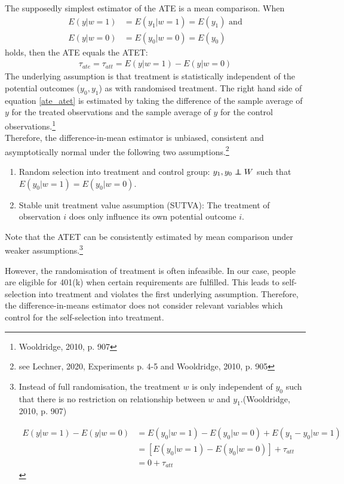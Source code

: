 \documentclass{article}
\newcommand\independent{\protect\mathpalette{\protect\independenT}{\perp}}
\def\independenT#1#2{\mathrel{\rlap{$#1#2$}\mkern2mu{#1#2}}}
\begin{document}
The supposedly simplest estimator of the ATE is a mean comparison. When 
\begin{align*}
    E(y|w=1) &= E(y_1|w=1)=E(y_1) \text{   and} \\
    E(y|w=0) &= E(y_0|w=0)=E(y_0)
\end{align*}
holds, then the ATE equals the ATET:
\begin{align}
    \tau_{ate} = \tau_{att} = E(y|w=1) - E(y|w=0)
    \label{ate_atet}
\end{align}
The underlying assumption is that treatment is statistically independent of the potential outcomes ($y_0, y_1$) as with randomised treatment. The right hand side of equation \ref{ate_atet} is estimated by taking the difference of the sample average of $y$ for the treated observations and the sample average of $y$ for the control observations.\footnote{Wooldridge, 2010, p. 907} \\
Therefore, the difference-in-mean estimator is unbiased, consistent and asymptotically normal under the following two assumptions.\footnote{see Lechner, 2020, Experiments p. 4-5 and Wooldridge, 2010, p. 905}
\begin{enumerate}
    \item Random selection into treatment and control group: $y_1, y_0 \independent W$ such that $ E(y_0|w=1) = E(y_0|w=0)$.
    \item Stable unit treatment value assumption (SUTVA): The treatment of observation $i$ does only influence its own potential outcome $i$.
\end{enumerate}

Note that the ATET can be consistently estimated by mean comparison under weaker assumptions.\footnote{Instead of full randomisation, the treatment $w$ is only independent of $y_0$ such that there is no restriction on relationship between $w$ and $y_1$.(Wooldridge, 2010, p. 907)

\begin{align*}
    E(y|w=1) - E(y|w=0) &= E(y_0|w=1) - E(y_0|w=0) + E(y_1-y_0|w=1) \\
    &= [E(y_0|w=1) - E(y_0|w=0)] + \tau_{att} \\
    &= 0 + \tau_{att}
\end{align*}}

However, the randomisation of treatment is often infeasible. In our case, people are eligible for 401(k) when certain requirements are fulfilled. This leads to self-selection into treatment and violates the first underlying assumption. Therefore, the difference-in-means estimator does not consider relevant variables which control for the self-selection into treatment.
\end{document}
